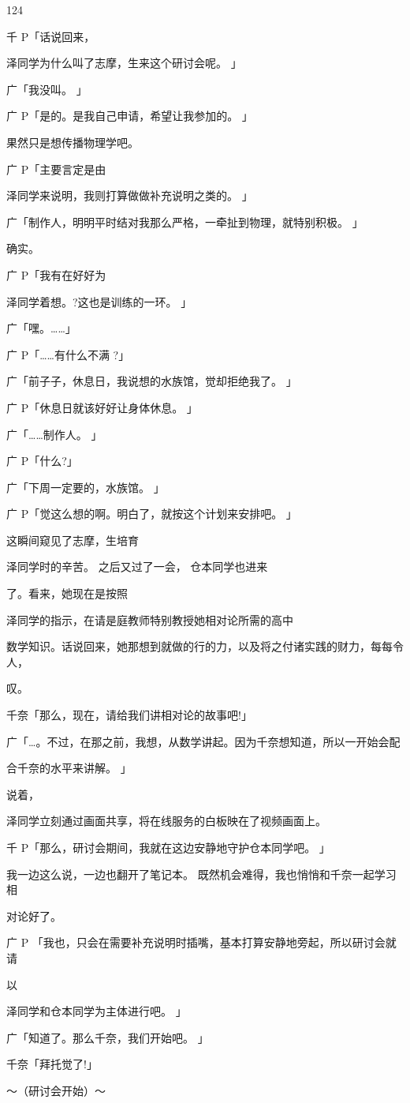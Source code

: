 124\par
千 P「话说回来，\par
泽同学为什么叫了志摩，生来这个研讨会呢。 」\par
广「我没叫。 」\par
广 P「是的。是我自己申请，希望让我参加的。 」\par
果然只是想传播物理学吧。\par
广 P「主要言定是由\par
泽同学来说明，我则打算做做补充说明之类的。 」\par
广「制作人，明明平时结对我那么严格，一牵扯到物理，就特别积极。 」\par
确实。\par
广 P「我有在好好为\par
泽同学着想。?这也是训练的一环。 」\par
广「嘿。……」\par
广 P「……有什么不满 ?」\par
广「前子子，休息日，我说想的水族馆，觉却拒绝我了。 」\par
广 P「休息日就该好好让身体休息。 」\par
广「……制作人。 」\par
广 P「什么?」\par
广「下周一定要的，水族馆。 」\par
广 P「觉这么想的啊。明白了，就按这个计划来安排吧。 」\par
这瞬间窥见了志摩，生培育\par
泽同学时的辛苦。 之后又过了一会， 仓本同学也进来\par
了。看来，她现在是按照\par
泽同学的指示，在请是庭教师特别教授她相对论所需的高中\par
数学知识。话说回来，她那想到就做的行的力，以及将之付诸实践的财力，每每令人，\par
叹。\par
千奈「那么，现在，请给我们讲相对论的故事吧!」\par
广「…。不过，在那之前，我想，从数学讲起。因为千奈想知道，所以一开始会配\par
合千奈的水平来讲解。 」\par
说着，\par
泽同学立刻通过画面共享，将在线服务的白板映在了视频画面上。\par
千 P「那么，研讨会期间，我就在这边安静地守护仓本同学吧。 」\par
我一边这么说，一边也翻开了笔记本。 既然机会难得，我也悄悄和千奈一起学习相\par
对论好了。\par
广 P 「我也，只会在需要补充说明时插嘴，基本打算安静地旁起，所以研讨会就请\par
以\par
泽同学和仓本同学为主体进行吧。 」\par
广「知道了。那么千奈，我们开始吧。 」\par
千奈「拜托觉了!」\par
～（研讨会开始）～\par

